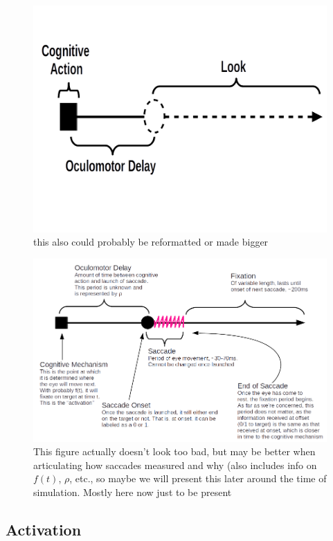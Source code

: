 \documentclass{article}
\begin{document}
\begin{figure}
\centering
\includegraphics[scale=0.25]{om_delay2.png}
\caption{this also could probably be reformatted or made bigger}
\label{fig:sac_fix_look_om}
\end{figure}


\begin{figure}
\centering
\includegraphics[scale=0.5]{labeled_full_diagram.png}
\caption{This figure actually doesn't look too bad, but may be better when articulating how saccades measured and why (also includes info on $f(t)$, $\rho$, etc., so maybe we will present this later around the time of simulation. Mostly here now just to be present}
\label{fig:full_diagram_looks}
\end{figure}

\subsection{Activation}
\end{document}
